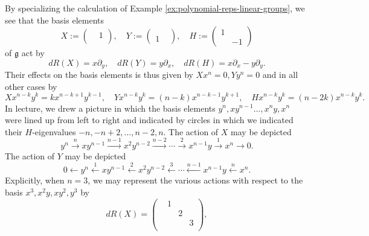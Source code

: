 \documentclass[reqno]{amsart} 
\begin{document}
By specializing
the calculation of Example
\ref{ex:polynomial-reps-linear-groups},
we see that the basis elements
\begin{equation*}
  X := 
\begin{pmatrix}
    & 1 \\
    & 
  \end{pmatrix}
,
  \quad
  Y := 
\begin{pmatrix}
    &  \\
    1 & 
  \end{pmatrix}
,
  \quad
  H := 
\begin{pmatrix}
    1 &  \\
    & -1
  \end{pmatrix}
\end{equation*}
of $\mathfrak{g}$
act by
\begin{equation*}
  d R(X) =
  x \partial_y,
  \quad
  d R(Y)
  = y \partial_x,
  \quad
  d R(H)
  = x \partial_x - y \partial_y.
\end{equation*}
Their effects on the basis elements
is thus given by
$X x^n = 0,
Y y^n = 0$
and in all other cases by
\begin{equation*}
  X x^{n-k} y^k
  = k x^{n-k+1} y^{k-1},
  \quad 
  Y x^{n-k} y^k
  = (n-k) x^{n-k-1} y^{k+1},
  \quad 
  H x^{n-k} y^k
  = (n- 2 k) x^{n-k} y^{k}.
\end{equation*}
In lecture,
we drew a picture
in which the basis elements
$y^n, x y^{n-1} \dotsc, x^n y, x^n$ were lined up from left to right
and indicated by circles in which we indicated their
$H$-eigenvalues
$-n, -n+2, \dotsc, n-2, n$.
The action of $X$ may be depicted
\begin{equation*}
  y^n \xrightarrow{n}
  x y^{n-1} \xrightarrow{n-1}
  x^2 y^{n-2} \xrightarrow{n-2}
  \dotsb \xrightarrow{2}
  x^{n-1} y
  \xrightarrow{1}
  x^n
  \rightarrow 0.
\end{equation*}
The action of $Y$ may be depicted
\begin{equation*}
  0
  \leftarrow
  y^n \xleftarrow{1}
  x y^{n-1} \xleftarrow{2}
  x^2 y^{n-2} \xleftarrow{3}
  \dotsb \xleftarrow{n-1}
  x^{n-1} y
  \xleftarrow{n}
  x^n.
\end{equation*}
Explicitly, when $n = 3$,
we may represent the various actions
with respect to the basis
$x^3, x^2 y, x y^2, y^3$
by
\begin{equation*}
  d R(X)
  = 
\begin{pmatrix}
    & 1 & & \\
    &  & 2 & \\
    &  & & 3 \\
    & & &
  \end{pmatrix}
,
\end{equation*}
\end{document}
